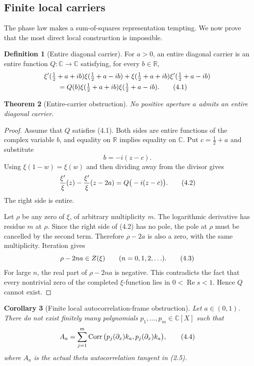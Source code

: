 \documentclass[11pt]{article}
\newtheorem{theorem}{Theorem}[section]
\newtheorem{corollary}[theorem]{Corollary}
\theoremstyle{definition}
\newtheorem{definition}[theorem]{Definition}
\theoremstyle{remark}
\newcommand{\C}{\mathbb C}
\newcommand{\R}{\mathbb R}
\newcommand{\Rea}{\operatorname{Re}}
\newcommand{\eqtag}[1]{\qquad\text{\upshape(#1)}}
\begin{document}
\subsection{Finite local carriers}

The phase law makes a sum-of-squares representation tempting.  We now
prove that the most direct local construction is impossible.

\begin{definition}[Entire diagonal carrier]
For \(a>0\), an entire diagonal carrier is an entire function
\(Q:\C\to\C\) satisfying, for every \(b\in\R\),
\[
\begin{aligned}
&\xi'(\tfrac12+a+ib)\xi(\tfrac12+a-ib)
 +\xi(\tfrac12+a+ib)\xi'(\tfrac12+a-ib)\\
&\qquad =
Q(b)\xi(\tfrac12+a+ib)\xi(\tfrac12+a-ib).            \eqtag{4.1}
\end{aligned}
\]
\end{definition}

\begin{theorem}[Entire-carrier obstruction]
\label{thm:entire}
No positive aperture \(a\) admits an entire diagonal carrier.
\end{theorem}

\begin{proof}
Assume that \(Q\) satisfies (4.1).  Both sides are entire functions of
the complex variable \(b\), and equality on \(\R\) implies equality on
\(\C\).  Put \(c=\frac12+a\) and substitute
\[
  b=-i(z-c).
\]
Using \(\xi(1-w)=\xi(w)\) and then dividing away from the divisor gives
\[
 \frac{\xi'}{\xi}(z)
 -\frac{\xi'}{\xi}(z-2a)
 =Q\big(-i(z-c)\big).                                \eqtag{4.2}
\]
The right side is entire.

Let \(\rho\) be any zero of \(\xi\), of arbitrary multiplicity \(m\).
The logarithmic derivative has residue \(m\) at \(\rho\).  Since the
right side of (4.2) has no pole, the pole at \(\rho\) must be cancelled
by the second term.  Therefore \(\rho-2a\) is also a zero, with the same
multiplicity.  Iteration gives
\[
  \rho-2na\in Z(\xi)\qquad(n=0,1,2,\ldots).           \eqtag{4.3}
\]
For large \(n\), the real part of \(\rho-2na\) is negative.  This
contradicts the fact that every nontrivial zero of the completed
\(\xi\)-function lies in \(0<\Rea s<1\).  Hence \(Q\) cannot exist.
\end{proof}

\begin{corollary}[Finite local autocorrelation-frame obstruction]
\label{cor:frame}
Let \(a\in(0,1)\).  There do not exist finitely many polynomials
\(p_1,\ldots,p_m\in\C[X]\) such that
\[
  A_a
  =\sum_{j=1}^m
    \operatorname{Corr}\big(p_j(\partial_x)k_a,
                            p_j(\partial_x)k_a\big),               \eqtag{4.4}
\]
where \(A_a\) is the actual theta autocorrelation tangent in (2.5).
\end{corollary}
\end{document}

